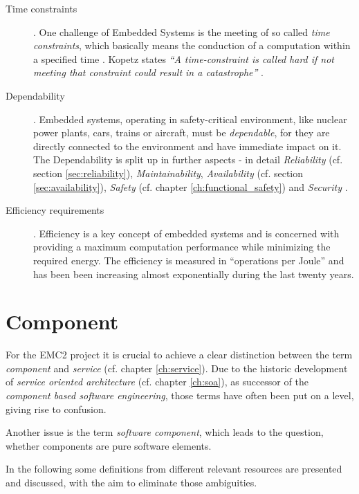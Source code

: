 \begin{description}
	\item [Time constraints].
	One challenge of Embedded Systems is the meeting of so called \emph{time constraints}, which basically means the conduction of a computation within a specified time \cite[p.8-9]{marwedel} \cite{rodrigues2011}. Kopetz states \emph{``A time-constraint is called hard if not meeting that constraint could result in a catastrophe''} \cite{kopetz}.
	\item [Dependability].
	Embedded systems, operating in safety-critical environment, like nuclear power plants, cars, trains or aircraft, must be \emph{dependable}, for they are directly connected to the environment and have immediate impact on it. The Dependability is split up in further aspects - in detail \emph{Reliability} (cf. section \ref{sec:reliability}), \emph{Maintainability}, \emph{Availability} (cf. section \ref{sec:availability}), \emph{Safety} (cf. chapter \ref{ch:functional_safety}) and \emph{Security} \cite[p.4-5]{marwedel}.
	\item [Efficiency requirements].
	Efficiency is a key concept of embedded systems and is concerned with providing a maximum computation performance while minimizing the required energy. The efficiency is measured in ``operations per Joule'' and has been been increasing almost exponentially during the last twenty years.
\end{description}






\section{Component}

\label{ch:component}

For the EMC2 project it is crucial to achieve a clear distinction between the term \emph{component} and \emph{service} (cf. chapter \ref{ch:service}). Due to the historic development of \emph{service oriented architecture} (cf. chapter \ref{ch:soa}), as successor of the \emph{component based software engineering}, those terms have often been put on a level, giving rise to confusion. 

Another issue is the term \emph{software component}, which leads to the question, whether components are pure software elements.

In the following some definitions from different relevant resources are presented and discussed, with the aim to eliminate those ambiguities.

